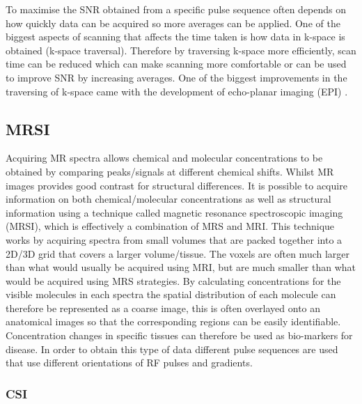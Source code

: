 \documentclass[class=article, crop=false]{standalone}
\begin{document}
To maximise the SNR obtained from a specific pulse sequence often depends on how quickly data can be acquired so more averages can be applied. One of the biggest aspects of scanning that affects the time taken is how data in k-space is obtained (k-space traversal). Therefore by traversing k-space more efficiently, scan time can be reduced which can make scanning more comfortable or can be used to improve SNR by increasing averages. One of the biggest improvements in the traversing of k-space came with the development of echo-planar imaging (EPI) \cite{Stehling1991Echo-planarSecond}.

\subsection{MRSI}

Acquiring MR spectra allows chemical and molecular concentrations to be obtained by comparing peaks/signals at different chemical shifts. Whilst MR images provides good contrast for structural differences. It is possible to acquire information on both chemical/molecular concentrations as well as structural information using a technique called magnetic resonance spectroscopic imaging (MRSI), which is effectively a combination of MRS and MRI. This technique works by acquiring spectra from small volumes that are packed together into a 2D/3D grid that covers a larger volume/tissue. The voxels are often much larger than what would usually be acquired using MRI, but are much smaller than what would be acquired using MRS strategies. By calculating concentrations for the visible molecules in each spectra the spatial distribution of each molecule can therefore be represented as a coarse image, this is often overlayed onto an anatomical images so that the corresponding regions can be easily identifiable. Concentration changes in specific tissues can therefore be used as bio-markers for disease. In order to obtain this type of data different pulse sequences are used that use different orientations of RF pulses and gradients. 

\subsubsection{CSI}
\end{document}
